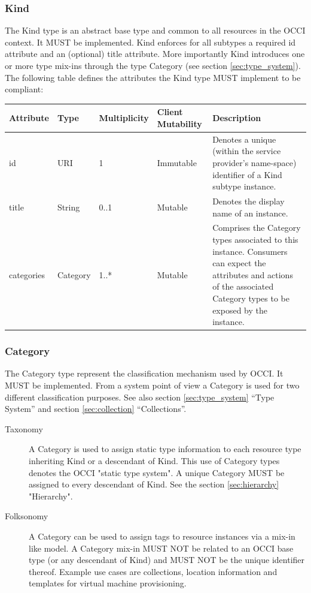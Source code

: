 \documentclass[10pt,a4paper,british]{article}
\begin{document}
\subsubsection{Kind}
The Kind type is an abstract base type and common to all resources in
the OCCI context. It MUST be implemented. Kind enforces for all
subtypes a required id attribute and an (optional) title
attribute. More importantly Kind introduces one or more type mix-ins
through the type Category (see section \ref{sec:type_system}). The
following table defines the attributes the Kind type MUST implement to
be compliant:

\begin{tabular}{l|l|l|l|p{2.7in}}
Attribute & Type & Multiplicity & Client Mutability & Description \\
\hline
id & URI & 1 & Immutable & Denotes a unique (within the service provider's name-space) identifier of a Kind subtype instance. \\
title & String & 0..1 & Mutable & Denotes the display name of an instance. \\
categories & Category & 1..* & Mutable\footnotemark[1] & Comprises the Category types associated to this instance. Consumers can expect the attributes and actions of the associated Category types to be exposed by the instance. \\ 
\end{tabular}
\addtocounter{footnote}{1}

\subsubsection{Category}
The Category type represent the classification mechanism used by
OCCI. It MUST be implemented. From a system point of view a Category
is used for two different classification purposes. See also section
\ref{sec:type_system} ``Type System'' and section \ref{sec:collection}
``Collections''.

\begin{description}
\item[Taxonomy] A Category is used to assign static type information
  to each resource type inheriting Kind or a descendant of Kind. This
  use of Category types denotes the OCCI "static type system". A
  unique Category MUST be assigned to every descendant of Kind. See
  the section \ref{sec:hierarchy} "Hierarchy".
\item[Folksonomy] A Category can be used to assign tags to resource
  instances via a mix-in like model. A Category mix-in MUST NOT be
  related to an OCCI base type (or any descendant of Kind) and MUST
  NOT be the unique identifier thereof.  Example use cases are
  collections, location information and templates for virtual machine
  provisioning.
\end{description}
\end{document}
